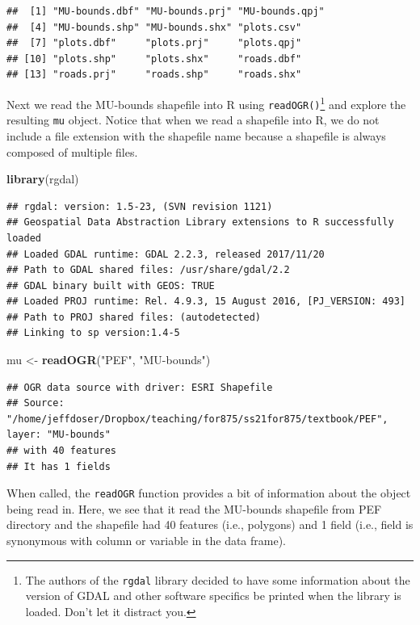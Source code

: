 \documentclass[
]{krantz}
\newenvironment{Shaded}{\begin{snugshade}}{\end{snugshade}}
\newcommand{\KeywordTok}[1]{\textcolor[rgb]{0.13,0.29,0.53}{\textbf{#1}}}
\newcommand{\NormalTok}[1]{#1}
\newcommand{\StringTok}[1]{\textcolor[rgb]{0.31,0.60,0.02}{#1}}
\begin{document}
\begin{verbatim}
##  [1] "MU-bounds.dbf" "MU-bounds.prj" "MU-bounds.qpj"
##  [4] "MU-bounds.shp" "MU-bounds.shx" "plots.csv"    
##  [7] "plots.dbf"     "plots.prj"     "plots.qpj"    
## [10] "plots.shp"     "plots.shx"     "roads.dbf"    
## [13] "roads.prj"     "roads.shp"     "roads.shx"
\end{verbatim}

Next we read the MU-bounds shapefile into R using \texttt{readOGR()}\footnote{The authors of the \texttt{rgdal} library decided to have some information about the version of GDAL and other software specifics be printed when the library is loaded. Don't let it distract you.} and explore the resulting \texttt{mu} object. Notice that when we read a shapefile into R, we do not include a file extension with the shapefile name because a shapefile is always composed of multiple files.

\begin{Shaded}
\begin{Highlighting}[]
\KeywordTok{library}\NormalTok{(rgdal)}
\end{Highlighting}
\end{Shaded}

\begin{verbatim}
## rgdal: version: 1.5-23, (SVN revision 1121)
## Geospatial Data Abstraction Library extensions to R successfully loaded
## Loaded GDAL runtime: GDAL 2.2.3, released 2017/11/20
## Path to GDAL shared files: /usr/share/gdal/2.2
## GDAL binary built with GEOS: TRUE 
## Loaded PROJ runtime: Rel. 4.9.3, 15 August 2016, [PJ_VERSION: 493]
## Path to PROJ shared files: (autodetected)
## Linking to sp version:1.4-5
\end{verbatim}

\begin{Shaded}
\begin{Highlighting}[]
\NormalTok{mu \textless{}{-}}\StringTok{ }\KeywordTok{readOGR}\NormalTok{(}\StringTok{"PEF"}\NormalTok{, }\StringTok{"MU{-}bounds"}\NormalTok{)}
\end{Highlighting}
\end{Shaded}

\begin{verbatim}
## OGR data source with driver: ESRI Shapefile 
## Source: "/home/jeffdoser/Dropbox/teaching/for875/ss21for875/textbook/PEF", layer: "MU-bounds"
## with 40 features
## It has 1 fields
\end{verbatim}

When called, the \texttt{readOGR} function provides a bit of information about the object being read in. Here, we see that it read the MU-bounds shapefile from PEF directory and the shapefile had 40 features (i.e., polygons) and 1 field (i.e., field is synonymous with column or variable in the data frame).
\end{document}
